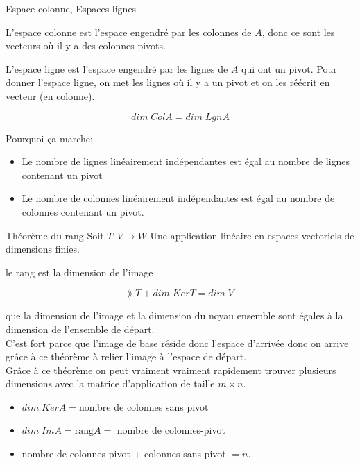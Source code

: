 \begin{parag}{Espace-colonne, Espaces-lignes}
    \begin{truc}
        L'espace colonne est l'espace engendré par les colonnes de $A$, donc ce sont les vecteurs où il y a des colonnes pivots.
    \end{truc}
    \begin{truc}
        L'espace ligne est l'espace engendré par les lignes de $A$ qui ont un pivot. Pour donner l'espace ligne, on met les lignes où il y a un pivot et on les réécrit en vecteur (en colonne).
    \end{truc}
    \begin{truc}
        \[dim\; ColA = dim\; LgnA\]
    \end{truc}
    Pourquoi ça marche:
    \begin{itemize}
        \item Le nombre de lignes linéairement indépendantes est égal au nombre de lignes contenant un pivot
        \item Le nombre de colonnes linéairement indépendantes est égal au nombre de colonnes contenant un pivot.
    \end{itemize}
\end{parag}

\begin{parag}{Théorème du rang}
Soit $T: V \to W$ Une application linéaire en espaces vectoriels de dimensions finies.
    \begin{truc} 
        le rang est la dimension de l'image
    \end{truc}
    \begin{truc}
        \begin{formule}
            \[\rang\; T + dim\; KerT = dim\; V\]
        \end{formule}
    \end{truc}
    que la dimension de l'image et la dimension du noyau ensemble sont égales à la dimension de l'ensemble de départ.\\
    C'est fort parce que l'image de base réside donc l'espace d'arrivée donc on arrive grâce à ce théorème à relier l'image à l'espace de départ. 
    \\
    Grâce à ce théorème on peut vraiment vraiment rapidement trouver plusieurs dimensions avec la matrice d'application de taille $m \times n$.
    \begin{itemize}
        \item $dim\; KerA = $nombre de colonnes sans pivot
        \item $dim\; ImA = \text{rang}A = $ nombre de colonnes-pivot
        \item nombre de colonnes-pivot + colonnes sans pivot $= n$.
    \end{itemize}
\end{parag}

